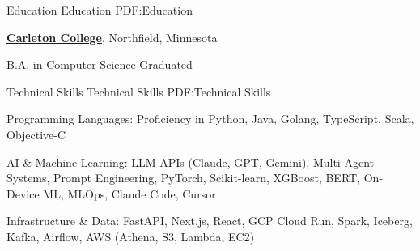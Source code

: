 \documentclass[a4paper,MMMyyyy,nonstopmode]{simpleresumecv}
\begin{document}
\begin{Body}





\Section
{Education}
{Education}
{PDF:Education}

\Entry
\href{https://www.carleton.edu/}
{\textbf{Carleton College}},
Northfield, Minnesota

\Gap
\BulletItem
B.A. in
\href{https://apps.carleton.edu/curricular/cs/}
{Computer Science}
\hfill
Graduated 


\Section
{Technical Skills}
{Technical Skills}
{PDF:Technical Skills}

\BulletItem
Programming Languages: Proficiency in Python, Java, Golang, TypeScript, Scala, Objective-C

\Gap
\BulletItem
AI \& Machine Learning: LLM APIs (Claude, GPT, Gemini), Multi-Agent Systems, Prompt Engineering, PyTorch, Scikit-learn, XGBoost, BERT, On-Device ML, MLOps, Claude Code, Cursor

\Gap
\BulletItem
Infrastructure \& Data: FastAPI, Next.js, React, GCP Cloud Run, Spark, Iceberg, Kafka, Airflow, AWS (Athena, S3, Lambda, EC2)
\let\clearpage\relax

\end{Body}
\end{document}

